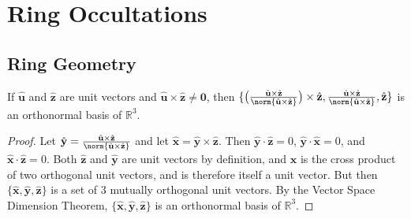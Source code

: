 \documentclass[crop=false,class=article,oneside]{standalone}
\begin{document}
    \ifx\ifresearchnotesosthemathematicsofcassini\undefined
        \section*{Ring Occultations}
        \setcounter{section}{1}
        \renewcommand\thesubfigure{%
            \arabic{section}.\arabic{figure}.\arabic{subfigure}%
        }
    \fi
    \subsection{Ring Geometry}
        \begin{theorem}
            \label{theorem:ring_occ_geom_x_y_z_orthonormal_basis}
            If $\hat{\mathbf{u}}$ and $\hat{\mathbf{z}}$ are unit
            vectors and
            $\hat{\mathbf{u}}\times%
             \hat{\mathbf{z}}\ne\mathbf{0}$,
            then
            $\{\big(%
                \frac{\hat{\mathbf{u}}\times\hat{\mathbf{z}}}%
                     {%
                        \norm{\hat{\mathbf{u}}\times%
                        \hat{\mathbf{z}}}%
                     }%
             \big)\times\hat{\mathbf{z}},%
             \frac{\hat{\mathbf{u}}\times\hat{\mathbf{z}}}%
                  {\norm{\hat{\mathbf{u}}\times\hat{\mathbf{z}}}},%
             \hat{\mathbf{z}}\}$
            is an orthonormal basis of $\mathbb{R}^{3}$.
        \end{theorem}
        \begin{proof}
            Let
            $\hat{\mathbf{y}}%
             =\frac{\hat{\mathbf{u}}\times\hat{\mathbf{z}}}%
                   {\norm{\hat{\mathbf{u}}\times\hat{\mathbf{z}}}}$
            and let
            $\hat{\mathbf{x}}%
             =\hat{\mathbf{y}}\times\hat{\mathbf{z}}$.
            Then $\hat{\mathbf{y}}\cdot\hat{\mathbf{z}}=0$,
            $\hat{\mathbf{y}}\cdot\hat{\mathbf{x}}=0$,
            and $\hat{\mathbf{x}}\cdot\hat{\mathbf{z}}=0$.
            Both $\hat{\mathbf{z}}$ and $\hat{\mathbf{y}}$ are unit
            vectors by definition, and $\hat{\mathbf{x}}$ is the
            cross product of two orthogonal unit vectors, and is
            therefore itself a unit vector. But then
            $\{\hat{\mathbf{x}},\hat{\mathbf{y}},\hat{\mathbf{z}}\}$
            is a set of $3$ mutually orthogonal unit vectors.
            By the Vector Space Dimension Theorem,
            $\{\hat{\mathbf{x}},%
               \hat{\mathbf{y}},%
               \hat{\mathbf{z}}\}$
            is an orthonormal basis of $\mathbb{R}^3$.
        \end{proof}
\end{document}
